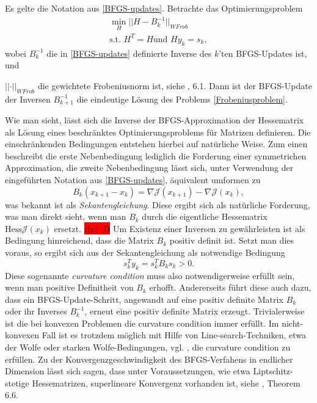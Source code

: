 \begin{theorem}
		
	Es gelte die Notation aus \ref{BFGS-updates}. Betrachte das Optimierungsproblem
	\begin{equation}\label{Frobeniusproblem}
	\begin{aligned}
		\underset{H}{\min} \vert\vert H - B_k^{-1} \vert\vert _{WFrob} \\
		\text{s.t. } H^T = H \text{und } H y_k = s_k,
	\end{aligned}
	\end{equation}
	wobei $B_k^{-1}$ die in \ref{BFGS-updates} definierte Inverse des $k$'ten BFGS-Updates ist, und 

$\vert\vert \cdot \vert\vert_{WFrob}$ die gewichtete Frobeniusnorm ist, siehe \cite{Nocedal}, 6.1. Dann ist der BFGS-Update der Inversen $B_{k+1}^{-1}$ die eindeutige Lösung des Problems \ref{Frobeniusproblem}.
\end{theorem}
Wie man sieht, lässt sich die Inverse der BFGS-Approximation der Hessematrix als Lösung eines beschränktes Optimierungsproblems für Matrizen definieren. Die einschränkenden Bedingungen entstehen hierbei auf natürliche Weise. Zum einen beschreibt die erste Nebenbedingung lediglich die Forderung einer symmetrichen Approximation, die zweite Nebenbedingung lässt sich, unter Verwendung der eingeführten Notation aus \ref{BFGS-updates}, äquivalent umformen zu
\begin{equation}
	B_k (x_{k+1} - x_k) = \nabla \mathcal{J}(x_{k+1}) - \nabla \mathcal{J}(x_k),
\end{equation}
was bekannt ist als \textit{Sekantengleichung}. Diese ergibt sich als natürliche Forderung, was man direkt sieht, wenn man $B_k$ durch die eigentliche Hessematrix $\text{Hess}\mathcal{J}(x_k)$ ersetzt. \colorbox{red}{rly? :D} Um Existenz einer Inversen zu gewährleisten ist als Bedingung hinreichend, dass die Matrix $B_k$ positiv definit ist. Setzt man dies voraus, so ergibt sich aus der Sekantengleichung als notwendige Bedingung
\begin{equation}
	s_k^T y_k = s_k^T B_k s_k > 0.
\end{equation}
Diese sogenannte \textit{curvature condition} muss also notwendigerweise erfüllt sein, wenn man positive Definitheit von $B_k$ erhofft. Andererseits führt diese auch dazu, dass ein BFGS-Update-Schritt, angewandt auf eine positiv definite Matrix $B_k$ oder ihr Inverses $B_k^{-1}$, erneut eine positiv definite Matrix erzeugt. Trivialerweise ist die bei konvexen Problemen die curvature condition immer erfüllt. Im nicht-konvexen Fall ist es trotzdem möglich mit Hilfe von Line-search-Techniken, etwa der Wolfe oder starken Wolfe-Bedingungen, vgl. \cite{Nocedal}, die curvature condition zu erfüllen. Zu der Konvergenzgeschwindigkeit des BFGS-Verfahens in endlicher Dimension lässt sich sagen, dass unter Voraussetzungen, wie etwa Liptschitz-stetige Hessematrizen, superlineare Konvergenz vorhanden ist, siehe \cite{Nocedal}, Theorem 6.6.
